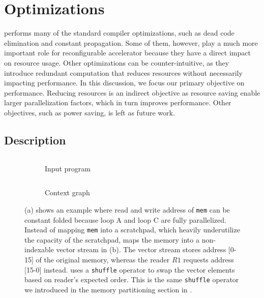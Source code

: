 \section{Optimizations}\label{sec:opt}
\name performs many of the standard compiler optimizations,
such as dead code elimination and constant propagation.
Some of them, however, play a much more important role for reconfigurable accelerator because they
have a direct impact on resource usage.
Other optimizations can be counter-intuitive, as they introduce redundant computation that
reduces resources without necessarily impacting performance.
In this discussion, we focus our primary objective on performance.
Reducing resources is an indirect objective as resource saving enable larger parallelization factors,
which in turn improves performance.
Other objectives, such as power saving, is left as future work.

\subsection{Description}\label{sec:des}

\begin{figure}
\centering
\begin{subfigure}[b]{0.4\textwidth}
\inputminted{python}{code/msr.py}
\caption{Input program}
\end{subfigure}
\hfill
\begin{subfigure}[b]{0.5\textwidth}
\inputminted{python}{code/msrctx.py}
\caption{Context graph}
\end{subfigure}
\caption[Memory strength reduction]{
  (a) shows an example where read and write address of \texttt{mem} can be constant folded because
  loop A and loop C are fully parallelized.
  Instead of mapping \texttt{mem} into a scratchpad, which heavily underutilize the capacity of the 
  scratchpad, \name maps the memory into a non-indexable vector stream in (b). The vector stream
  stores address [0-15] of the original memory, whereas the reader $R1$ requests address [15-0] instead.
  \name uses a \texttt{shuffle} operator to swap the vector elements based on reader's expected order.
  This is the same \texttt{shuffle} operator we introduced in the memory partitioning section in
  . 
}
\label{fig:msr}
\end{figure}

